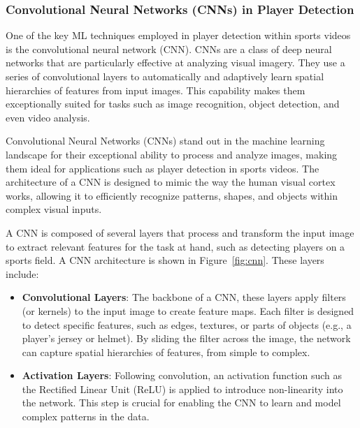 \documentclass[12pt, letterpaper]{article}
\begin{document}
{\begin{spacing}{1.2}

\subsubsection{Convolutional Neural Networks (CNNs) in Player Detection}
One of the key ML techniques employed in player detection within sports videos is the convolutional neural network (CNN). CNNs are a class of deep neural networks that are particularly effective at analyzing visual imagery. They use a series of convolutional layers to automatically and adaptively learn spatial hierarchies of features from input images. This capability makes them exceptionally suited for tasks such as image recognition, object detection, and even video analysis.

Convolutional Neural Networks (CNNs) stand out in the machine learning landscape for their exceptional ability to process and analyze images, making them ideal for applications such as player detection in sports videos. The architecture of a CNN is designed to mimic the way the human visual cortex works, allowing it to efficiently recognize patterns, shapes, and objects within complex visual inputs.

A CNN is composed of several layers that process and transform the input image to extract relevant features for the task at hand, such as detecting players on a sports field. A CNN architecture is shown in Figure~\ref{fig:cnn}. These layers include:

\begin{itemize}
    \item \textbf{Convolutional Layers}: The backbone of a CNN, these layers apply filters (or kernels) to the input image to create feature maps. Each filter is designed to detect specific features, such as edges, textures, or parts of objects (e.g., a player's jersey or helmet). By sliding the filter across the image, the network can capture spatial hierarchies of features, from simple to complex.

    \item \textbf{Activation Layers}: Following convolution, an activation function such as the Rectified Linear Unit (ReLU) is applied to introduce non-linearity into the network. This step is crucial for enabling the CNN to learn and model complex patterns in the data.


\end{itemize}
\end{spacing}}
\end{document}
